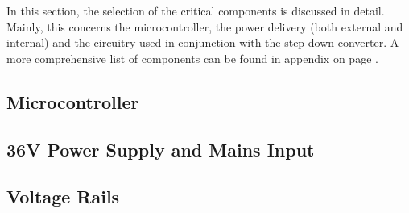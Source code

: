 In this  section, the  selection of  the critical  components is  discussed in
detail. Mainly, this  concerns the  microcontroller, the power  delivery (both
external  and  internal)  and  the  circuitry used  in  conjunction  with  the
step-down converter. A more  comprehensive list of components can  be found in
appendix  on page .


\subsection{Microcontroller}



\subsection{36V Power Supply and Mains Input}



\subsection{Voltage Rails}



